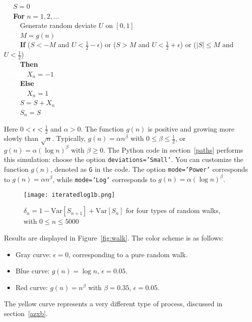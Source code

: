 \documentclass[oneside,10pt]{book}
\begin{document}
\noindent\textcolor{white}{00} $S=0$ \\
\textcolor{white}{00} {\bf For} $n = 1, 2,\dots$\\
\textcolor{white}{0000}  Generate random deviate $U$ on $[0,1]$\\
\textcolor{white}{0000}  $M=g(n)$\\
\textcolor{white}{0000}  {\bf If} ($S< -M$ and $U < \frac{1}{2}-\epsilon$) 
or ($S> M$ and $U < \frac{1}{2}+\epsilon$) or ($|S|\leq M$ and $U<\frac{1}{2}$) \\ 
\textcolor{white}{0000} {\bf Then} \\
\textcolor{white}{000000} $X_n=-1$ \\
\textcolor{white}{0000} {\bf Else} \\
\textcolor{white}{000000} $X_n=1$\\
\textcolor{white}{0000} $S=S+X_n$\\
\textcolor{white}{0000} $S_n=S$ \vspace{1ex}

\noindent Here $0<\epsilon<\frac{1}{2}$ and $\alpha>0$.  The function $g(n)$ is positive and 
 growing more slowly than $\sqrt{n}$. Typically, $g(n)=\alpha n^\beta$ with $0\leq \beta\leq\frac{1}{2}$, or $g(n)=\alpha (\log n)^\beta$
 with $\beta\geq 0$. 
The Python code in section~\ref{paths} performs this simulation: choose the option \texttt{deviations='Small'}. You can customize the function
 $g(n)$, denoted as \texttt{G} in the code. The option \texttt{mode='Power'} corresponds to $g(n)=\alpha n^\beta$,
 while \texttt{mode='Log'} corresponds to $g(n)=\alpha (\log n)^\beta$. 

\begin{figure}%
\centering
\texttt{[image: iteratedlog1b.png]}  
\caption{$\delta_n=1-\text{Var}[S_{n+1}]+\text{Var}[S_n]$ for four types of random walks, with $0\leq n\leq\num{5000}$}
\label{fig:lollog1b}
\end{figure}



\noindent Results are displayed in 
 Figure~\ref{fig:walk}. The color scheme is as follows:
\begin{itemize}
\item Gray curve: $\epsilon=0$, corresponding to a pure random walk.
\item Blue curve: $g(n)=\log n$, $\epsilon=0.05$.
\item Red curve: $g(n)=n^\beta$ with $\beta=0.35$, $\epsilon=0.05$.
\end{itemize}
The yellow curve represents a very different type of process, discussed in section~\ref{azxb}.
\end{document}
